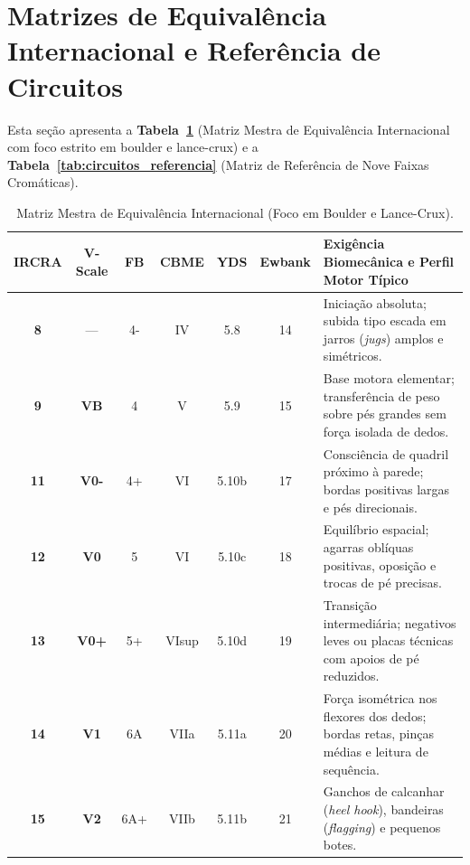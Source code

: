 \section{Matrizes de Equivalência Internacional e Referência de Circuitos}

Esta seção apresenta a \textbf{Tabela~\ref{tab:equivalencia_mestra}} (Matriz Mestra de Equivalência Internacional com foco estrito em boulder e lance-crux) e a \textbf{Tabela~\ref{tab:circuitos_referencia}} (Matriz de Referência de Nove Faixas Cromáticas).

\begin{table}[!htbp]
\centering
\caption{Matriz Mestra de Equivalência Internacional (Foco em Boulder e Lance-Crux).}
\label{tab:equivalencia_mestra}
\footnotesize
\renewcommand{\arraystretch}{1.15}
\begin{tabularx}{\linewidth}{ccccccX}
\toprule
\textbf{IRCRA} & \textbf{V-Scale} & \textbf{FB} & \textbf{CBME} & \textbf{YDS} & \textbf{Ewbank} & \textbf{Exigência Biomecânica e Perfil Motor Típico} \\
\midrule
\textbf{8}  & —   & 4-  & IV    & 5.8   & 14 & Iniciação absoluta; subida tipo escada em jarros (\textit{jugs}) amplos e simétricos. \\
\rowcolor{rowgray}
\textbf{9}  & \textbf{VB}  & 4   & V     & 5.9   & 15 & Base motora elementar; transferência de peso sobre pés grandes sem força isolada de dedos. \\
\textbf{11} & \textbf{V0-} & 4+  & VI    & 5.10b & 17 & Consciência de quadril próximo à parede; bordas positivas largas e pés direcionais. \\
\rowcolor{rowgray}
\textbf{12} & \textbf{V0}  & 5   & VI    & 5.10c & 18 & Equilíbrio espacial; agarras oblíquas positivas, oposição e trocas de pé precisas. \\
\textbf{13} & \textbf{V0+} & 5+  & VIsup & 5.10d & 19 & Transição intermediária; negativos leves ou placas técnicas com apoios de pé reduzidos. \\
\rowcolor{rowgray}
\textbf{14} & \textbf{V1}  & 6A  & VIIa  & 5.11a & 20 & Força isométrica nos flexores dos dedos; bordas retas, pinças médias e leitura de sequência. \\
\textbf{15} & \textbf{V2}  & 6A+ & VIIb  & 5.11b & 21 & Ganchos de calcanhar (\textit{heel hook}), bandeiras (\textit{flagging}) e pequenos botes. \\

\end{tabularx}
\end{table}
